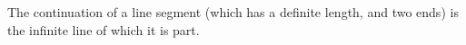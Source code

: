 The continuation of a line segment (which has
a definite length, and two ends) is the infinite line
of which it is part.